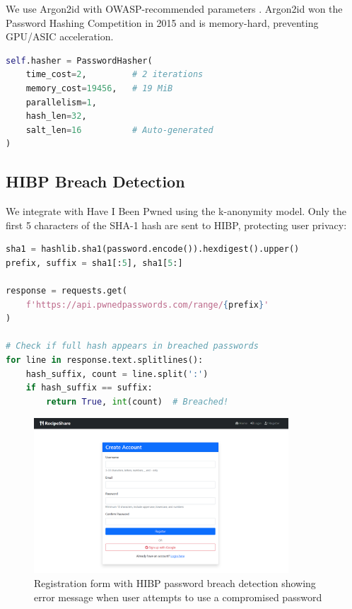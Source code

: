 \documentclass[12pt,a4paper]{article}
\begin{document}
We use Argon2id with OWASP-recommended parameters \cite{owasp_password}. Argon2id won the Password Hashing Competition in 2015 \cite{biryukov2016} and is memory-hard, preventing GPU/ASIC acceleration.

\begin{lstlisting}[language=Python]
self.hasher = PasswordHasher(
    time_cost=2,         # 2 iterations
    memory_cost=19456,   # 19 MiB
    parallelism=1,
    hash_len=32,
    salt_len=16          # Auto-generated
)
\end{lstlisting}

\subsection{HIBP Breach Detection}

We integrate with Have I Been Pwned using the k-anonymity model. Only the first 5 characters of the SHA-1 hash are sent to HIBP, protecting user privacy:

\begin{lstlisting}[language=Python]
sha1 = hashlib.sha1(password.encode()).hexdigest().upper()
prefix, suffix = sha1[:5], sha1[5:]

response = requests.get(
    f'https://api.pwnedpasswords.com/range/{prefix}'
)

# Check if full hash appears in breached passwords
for line in response.text.splitlines():
    hash_suffix, count = line.split(':')
    if hash_suffix == suffix:
        return True, int(count)  # Breached!
\end{lstlisting}

\begin{figure}[H]
    \centering
    \includegraphics[width=0.85\textwidth]{screenshots/registration_hibp_breach.png}
    \caption{Registration form with HIBP password breach detection showing error message when user attempts to use a compromised password}
    \label{fig:hibp}
\end{figure}
\end{document}
